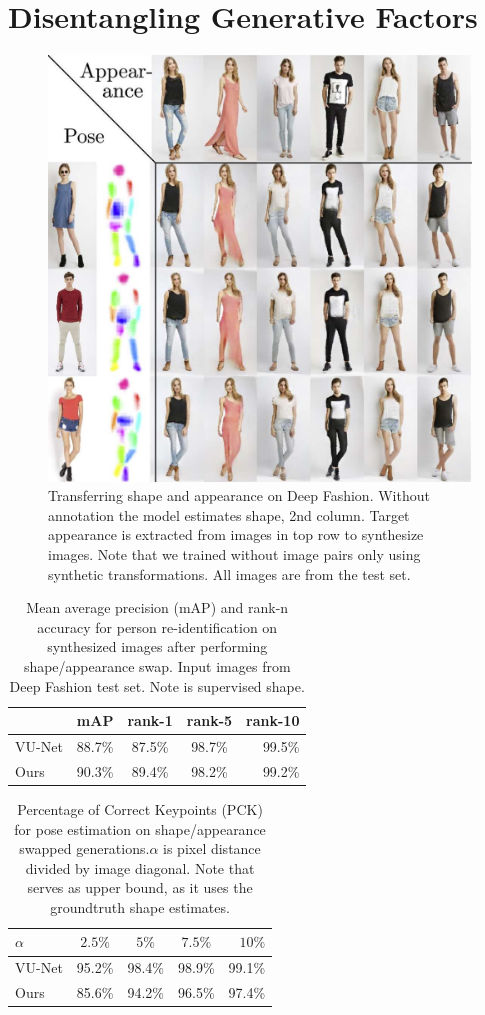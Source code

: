 \chapter{Disentangling Generative Factors}
	\begin{figure}[t]
		\centering
		\includegraphics[trim={0cm 0cm 0cm 0cm},clip, width=.5\linewidth]{fig/factor/swappy}
		\caption{Transferring shape and appearance on Deep Fashion. Without annotation the model estimates shape, 2nd column. Target appearance is extracted from images in top row to synthesize images. Note that we trained without image pairs only using synthetic transformations.
		All images are from the test set.}
		\label{fig:allswaps}
	\end{figure}

	\begin{table}
		\centering
		\caption{Mean average precision (mAP) and rank-n accuracy for person re-identification on synthesized images after performing shape/appearance swap. Input images from Deep Fashion test set. Note \cite{esser18} is supervised \wrt shape.}
		\label{tab:reid}
		\begin{tabular}{l|cccr}
			\hline
			& mAP & rank-1 & rank-5 & rank-10 \\ \hline
			VU-Net \cite{esser18} & 88.7\% & 87.5\% & {98.7}\% & {99.5}\% \\
			Ours & {90.3}\% & {89.4}\% &{98.2}\% & {99.2}\% \\ \hline
		\end{tabular}
	\end{table}

	\begin{table}
		\centering
		\caption{Percentage of Correct Keypoints (PCK) for pose estimation on shape/appearance swapped generations.\;$\alpha$ is pixel distance divided by image diagonal. Note that \cite{esser18} serves as upper bound, as it uses the groundtruth shape estimates.}
		\label{tab:pose}
		\begin{tabular}{l|cccr}
			\hline
			$\alpha$ & $2.5\%$ &  $5\%$ & $7.5\%$ & $10\%$ \\ \hline
			VU-Net \cite{esser18} & {95.2}\% & {98.4}\% & {98.9}\% & {99.1}\% \\
			Ours & 85.6\% & 94.2\% &96.5\% & 97.4\% \\ \hline
		\end{tabular}
	\end{table}


